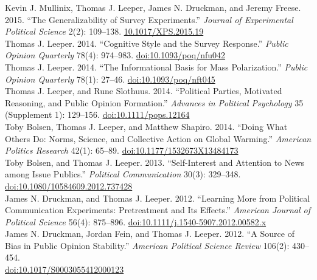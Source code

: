 \documentclass[12pt]{article}
\renewcommand{\section}[1]{\pagebreak[3]%
    \llap{\scshape\smash{\parbox[t]{\marginparwidth}{\raggedright {\color{lg}#1}}}}%
    \vspace{-\baselineskip}\par}
\newcommand{\topic}[1]{\pagebreak[3]\indent {\color{lg}{\footnotesize #1 }}\\}
\newcommand{\entry}[1]{\indent {\color{lg}\guillemotright}\hspace{2pt}#1\vspace{.25em}\\}
\begin{document}
\section{Selected\\Peer-Reviewed\\Publications}
\entry{Kevin J. Mullinix, Thomas J. Leeper, James N. Druckman, and Jeremy Freese. 2015. ``The Generalizability of Survey Experiments.'' {\em Journal of Experimental Political Science} 2(2): 109--138. \href{http://dx.doi.org/10.1017/XPS.2015.19}{10.1017/XPS.2015.19}}
\entry{Thomas J. Leeper. 2014. ``Cognitive Style and the Survey Response.'' {\em Public Opinion Quarterly} 78(4): 974--983. \href{http://dx.doi.org/10.1093/poq/nfu042}{doi:10.1093/poq/nfu042}}
\entry{Thomas J. Leeper. 2014. ``The Informational Basis for Mass Polarization.'' {\em Public Opinion Quarterly} 78(1): 27--46. \href{http://dx.doi.org/10.1093/poq/nft045}{doi:10.1093/poq/nft045}}
\entry{Thomas J. Leeper, and Rune Slothuus. 2014. ``Political Parties, Motivated Reasoning, and Public Opinion Formation.'' {\em Advances in Political Psychology} 35 (Supplement 1): 129--156. \href{http://dx.doi.org/10.1111/pops.12164}{doi:10.1111/pops.12164}}
\entry{Toby Bolsen, Thomas J. Leeper, and Matthew Shapiro. 2014. ``Doing What Others Do: Norms, Science, and Collective Action on Global Warming.'' {\em American Politics Research} 42(1): 65--89. \href{http://dx.doi.org/10.1177/1532673X13484173}{doi:10.1177/1532673X13484173}}
\entry{Toby Bolsen, and Thomas J. Leeper. 2013. ``Self-Interest and Attention to News among Issue Publics.'' {\em Political Communication} 30(3): 329--348.\\ \href{http://dx.doi.org/10.1080/10584609.2012.737428}{doi:10.1080/10584609.2012.737428}}
\entry{James N. Druckman, and Thomas J. Leeper. 2012. ``Learning More from Political Communication Experiments: Pretreatment and Its Effects.'' {\em American Journal of Political Science} 56(4): 875--896. \href{http://dx.doi.org/10.1111/j.1540-5907.2012.00582.x}{doi:10.1111/j.1540-5907.2012.00582.x}}
\entry{James N. Druckman, Jordan Fein, and Thomas J. Leeper. 2012. ``A Source of Bias in Public Opinion Stability.'' {\em American Political Science Review} 106(2): 430--454.\\ \href{http://dx.doi.org/10.1017/S0003055412000123}{doi:10.1017/S0003055412000123}}
\end{document}
